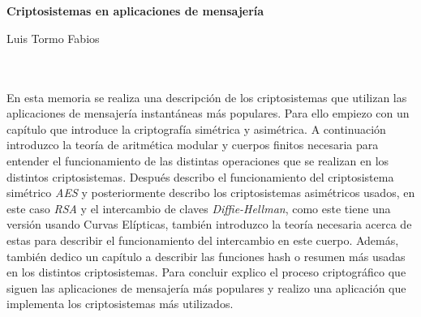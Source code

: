 \chapter*{}


%




\begin{center}
{\large\bfseries Criptosistemas en aplicaciones de mensajería}\\
\end{center}
\begin{center}
Luis Tormo Fabios\\
\end{center}

\\

\vspace{0.7cm}
\\

En esta memoria se realiza una descripción de los criptosistemas que utilizan las aplicaciones de mensajería instantáneas más populares. Para ello empiezo con un capítulo que introduce la criptografía simétrica y asimétrica. A continuación introduzco la teoría de aritmética modular y cuerpos finitos necesaria para entender el funcionamiento de las distintas operaciones que se realizan en los distintos criptosistemas. Después describo el funcionamiento del criptosistema simétrico \emph{AES} y posteriormente describo los criptosistemas asimétricos usados, en este caso \emph{RSA} y el intercambio de claves \emph{Diffie-Hellman}, como este tiene una versión usando Curvas Elípticas, también introduzco la teoría necesaria acerca de estas para describir el funcionamiento del intercambio en este cuerpo. Además, también dedico un capítulo a describir las funciones hash o resumen más usadas en los distintos criptosistemas. Para concluir explico el proceso criptográfico que siguen las aplicaciones de mensajería más populares y realizo una aplicación que implementa los criptosistemas más utilizados.

\cleardoublepage


